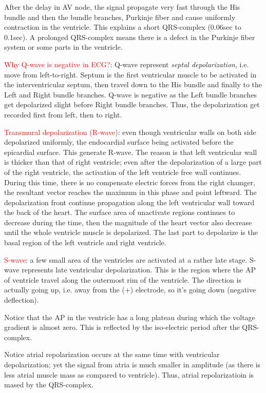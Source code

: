 After the delay in AV node, the signal propagate very fast through the His
bundle and then the bundle branches, Purkinje fiber and cause uniformly
contraction in the ventricle. This explains a short QRS-complex (0.06sec to
0.1sec). A prolonged QRS-complex means there is a defect in the Purkinje fiber
system or some parts in the ventricle.

\textcolor{red}{Why Q-wave is negative in ECG?}: Q-wave represent {\it septal
depolarization}, i.e. move from left-to-right.
Septum is the first ventricular muscle to be activated in the interventricular
septum, then travel down to the His bundle and finally to the Left and
Right bundle branches. Q-wave is negative as  the Left bundle branches get
depolarized slight before Right bundle branches. Thus, the depolarization
get recorded first from left, then to right.

\textcolor{red}{Transmural depolarization (R-wave)}: even though ventricular
walls on both side depolarized uniformly, the endocardial surface being activated before
the epicardial surface. This generate R-wave. The reason is that left
ventricular wall is thicker than that of right ventricle; even after the
depolarization of a large part of the right ventricle, the activation of the
left ventricle free wall continues. During this time, there is no compensate
electric forces from the right chamger, the resultant vector reaches the maximum
in this phase and point leftward. The depolarization front continue propagation
along the left ventricular wall toward the back of the heart. The surface area
of unactivate regions continues to decrease during the time, then the magnitude
of the heart vector also decrease until the whole ventricle muscle is
depolarized. The last part to depolarize is the basal region of the
left ventricle and right ventricle.

\textcolor{red}{S-wave}: a few small area of the ventricles are activated
at a rather late stage. S-wave represents late ventricular depolarization. This
is the region where the AP of ventricle travel along the outermost rim of the
ventricle. The direction is actually going up, i.e. away from the (+) electrode,
so it's going down (negative deflection).

Notice that the AP in the ventricle has a long plateau during which the voltage
gradient is almost zero. This is reflected by the iso-electric period after the
QRS-complex.

Notice atrial repolarization occurs at the same time with ventricular
depolarization; yet the signal from atria is much smaller in amplitude (as
there is less atrial muscle mass as compared to ventricle). Thus, atrial
repolarizatioin is mased by the QRS-complex.

